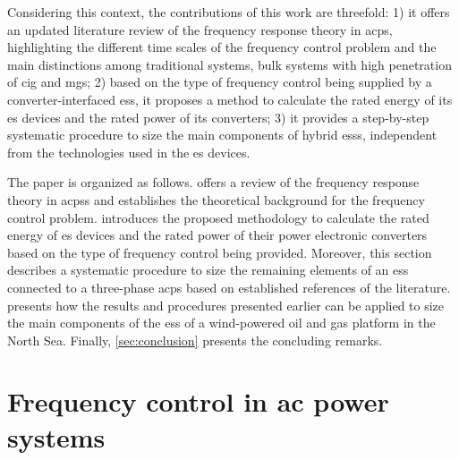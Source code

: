 \documentclass[utf8]{frontiersSCNS} %
\begin{document}
Considering this context, the contributions of this work are threefold: 1) it offers an updated literature review of the frequency response theory in \gls{acps}, highlighting the different time scales of the frequency control problem and the main distinctions among traditional systems, bulk systems with high penetration of \gls{cig} and \glspl{mg}; 2) based on the type of frequency control being supplied by a converter-interfaced \gls{ess}, it proposes a method to calculate the rated energy of its \gls{es} devices and the rated power of its converters; 3) it provides a step-by-step systematic procedure to size the main components of hybrid \glspl{ess}, independent from the technologies used in the \gls{es} devices.  

The paper is organized as follows.  offers a review of the frequency response theory in \glspl{acps} and establishes the theoretical background for the frequency control problem.  introduces the proposed methodology to calculate the rated energy of \gls{es} devices and the rated power of their power electronic converters based on the type of frequency control being provided. Moreover, this section describes a systematic procedure to size the remaining elements of an \gls{ess} connected to a three-phase \gls{acps} based on established references of the literature.  presents how the results and procedures presented earlier can be applied to size the main components of the \gls{ess} of a wind-powered oil and gas platform in the North Sea. Finally, \cref{sec:conclusion} presents the concluding remarks.

\section{Frequency control in ac power systems} \label{sec:freqcontrol}

\end{document}
